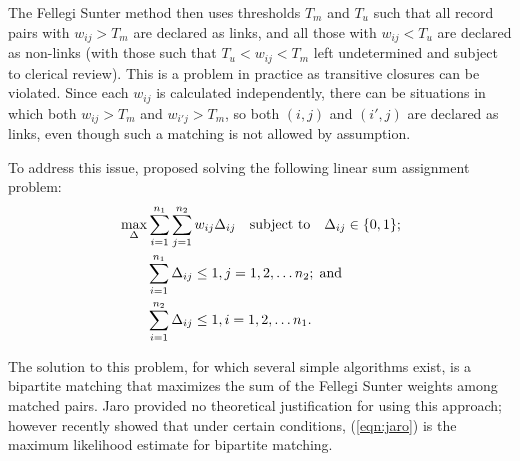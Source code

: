\documentclass[ba]{imsart}
\begin{document}
The Fellegi Sunter method then uses thresholds $T_m$ and $T_u$ such that all record pairs with $w_{ij} > T_m$ are declared as links, and all those with $w_{ij} < T_u$ are declared as non-links (with those such that $T_u < w_{ij} < T_m$ left undetermined and subject to clerical review). This is a problem in practice as transitive closures can be violated. Since each $w_{ij}$ is calculated independently, there can be situations in which both $w_{ij} > T_m$ and $w_{i'j} > T_m$, so both $(i,j)$ and $(i', j)$ are declared as links, even though such a matching is not allowed by assumption. 

To address this issue, \cite{jaro1989} proposed solving the following linear sum assignment problem:
\begin{align}
	\label{eqn:jaro}
	&\max_{\Delta} \sum_{i=1}^{n_1} \sum_{j=1}^{n_2} w_{ij} \Delta_{ij} 
	\quad \text{subject to} \quad \Delta_{ij} \in \{0,1\}; \\
	& \quad \quad \sum_{i=1}^{n_1}  \Delta_{ij}  \leq 1, j=1,2, \ldots n_2; \; \text{and} \notag\\
	& \quad \quad\sum_{i=1}^{n_2}  \Delta_{ij}  \leq 1, i=1,2, \ldots n_1. \notag
\end{align}

The solution to this problem, for which several simple algorithms exist, is a bipartite matching that maximizes the sum of the Fellegi Sunter weights among matched pairs. Jaro provided no theoretical justification for using this approach; however \cite{sadinle_bayesian_2017} recently showed that under certain conditions, (\ref{eqn:jaro}) is the maximum likelihood estimate for bipartite matching. 

%
%
%
\end{document}
